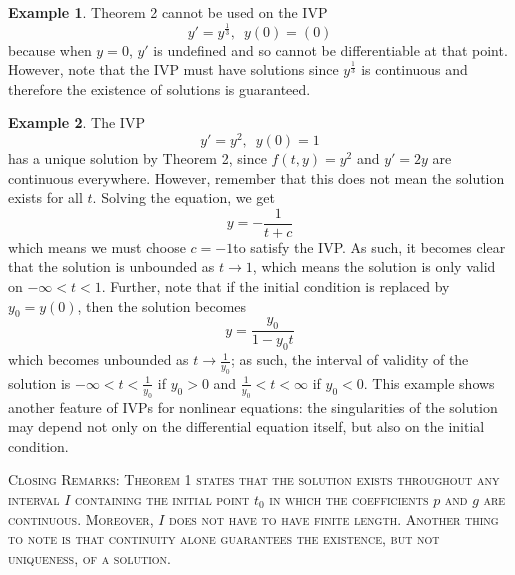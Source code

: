 \documentclass[11pt]{article}
\theoremstyle{definition}
\newtheorem{ex}{Example}
\begin{document}
\begin{ex}
    Theorem 2 cannot be used on the IVP \begin{equation}
        y' = y^{\frac{1}{3}}, \,\,\, y(0) = (0)
    \end{equation} because when $y = 0$, $y'$ is undefined and so cannot be differentiable at that point. However, note that the IVP must have solutions since $y^{\frac{1}{3}}$ is continuous and therefore the existence of solutions is guaranteed.
\end{ex}
\begin{ex}
    The IVP \begin{equation}
        y' = y^2, \,\,\,y(0) = 1
    \end{equation} has a unique solution by Theorem 2, since $f(t, y) = y^2$ and $y' = 2y$ are continuous everywhere. However, remember that this does not mean the solution exists for all $t$. Solving the equation, we get \begin{equation}
        y = -\frac{1}{t + c}
    \end{equation} which means we must choose $c = -1$to satisfy the IVP. As such, it becomes clear that the solution is unbounded as $t \longrightarrow 1$, which means the solution is only valid on $-\infty < t < 1$. Further, note that if the initial condition is replaced by $y_0 = y(0)$, then the solution becomes \begin{equation}
        y = \frac{y_0}{1 - y_0 t}
    \end{equation} which becomes unbounded as $t \longrightarrow \frac{1}{y_0}$; as such, the interval of validity of the solution is $-\infty < t < \frac{1}{y_0}$ if $y_0 > 0$ and $\frac{1}{y_0} < t < \infty$ if $y_0 < 0$. This example shows another feature of IVPs for nonlinear equations: the singularities of the solution may depend not only on the differential equation itself, but also on the initial condition.
\end{ex}
\textsc{\color{blue} Closing Remarks: Theorem 1 states that the solution exists throughout any interval $I$ containing the initial
point $t_0$ in which the coefficients $p$ and $g$ are continuous. Moreover, $I$ does not have to have finite length. Another thing to note is that continuity alone guarantees the existence, but not uniqueness, of a solution.}
\end{document}
